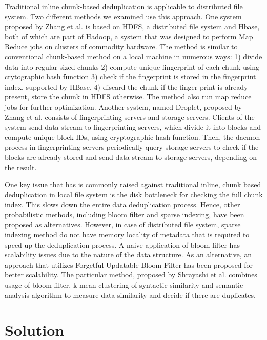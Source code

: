 \documentclass[11pt]{article}
\begin{document}
Traditional inline chunk-based deduplication is applicable to distributed file system. Two different methods we examined use this approach. One system proposed by Zhang et al. is based on HDFS, a distributed file system and Hbase, both of which are part of Hadoop, a system that was designed to perform Map Reduce jobs on clusters of commodity hardware. The method is similar to conventional chunk-based method on a local machine in numerous ways: 1) divide data into regular sized chunks 2) compute unique fingerprint of each chunk using crytographic hash function 3) check if the fingerprint is stored in the fingerprint index, supported by HBase. 4) discard the chunk if the finger print is already present, store the chunk in HDFS otherwise\cite{HDFSDe}. The method also run map reduce jobs for further optimization. Another system, named Droplet, proposed by Zhang et al. consists of fingerprinting servers and storage servers\cite{Droplet}. Clients of the system send data stream to fingerprinting servers, which divide it into blocks and compute unique block IDs, using cryptographic hash function. Then, the daemon process in fingerprinting servers periodically query storage servers to check if the blocks are already stored and send data stream to storage servers, depending on the result.

One key issue that has is commonly raised against traditional inline, chunk based deduplication in local file system is the disk bottleneck for checking the full chunk index.  This slows down the entire data deduplication process. Hence, other probabilistic methods, including bloom filter and sparse indexing, have been proposed as alternatives\cite{Sparse}. However, in case of distributed file system, sparse indexing method do not have memory locality of metadata that is required to speed up the deduplication process. A naive application of bloom filter has scalability issues due to the nature of the data structure. As an alternative, an approach that utilizes Forgetful Updatable Bloom Filter has been proposed for better scalability\cite{Bloom}. The particular method, proposed by Shrayashi et al. combines usage of bloom filter, k mean clustering of syntactic similarity and semantic analysis algorithm to measure data similarity and decide if there are duplicates.

\section {Solution}\label{soln}
\end{document}
